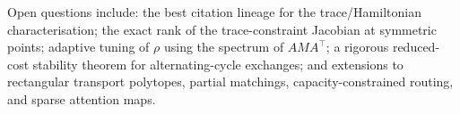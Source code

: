 \documentclass[11pt]{article}
\begin{document}
Open questions include: the best citation lineage for the trace/Hamiltonian characterisation; the exact rank of the trace-constraint Jacobian at symmetric points; adaptive tuning of $\rho$ using the spectrum of $AMA^\top$; a rigorous reduced-cost stability theorem for alternating-cycle exchanges; and extensions to rectangular transport polytopes, partial matchings, capacity-constrained routing, and sparse attention maps.



\end{document}
